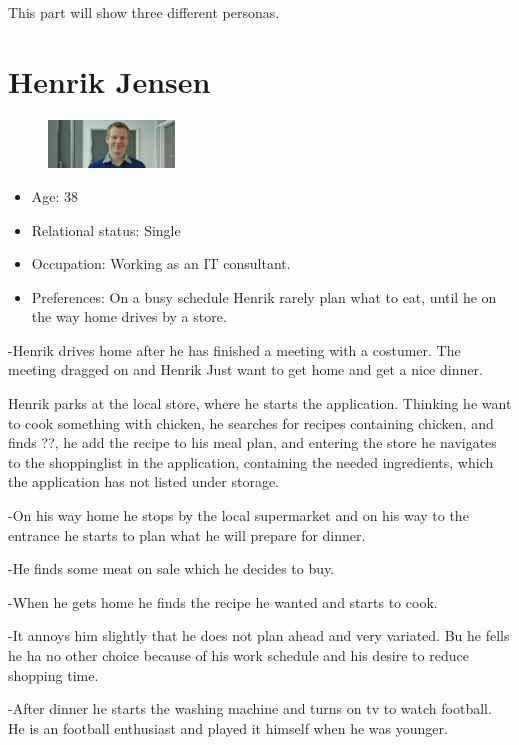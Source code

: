 This part will show three different personas.

\section{Henrik Jensen}
\begin{figure}[H]
	\includegraphics[width=0.30\textwidth]{Grafik/FoodPlanner/PersonaHenrikJensen}
	\label{PersonaHenrikJensen}
\end{figure}
\begin{itemize}
	\item Age: 38
	\item Relational status: Single
	\item Occupation: Working as an IT consultant.
	\item Preferences: On a busy schedule Henrik rarely plan what to eat, until he on the way home drives by a store.
\end{itemize}
-Henrik drives home after he has finished a meeting with a costumer. The meeting dragged on and Henrik Just want to get home and get a nice dinner.

Henrik parks at the local store, where he starts the application. Thinking he want to cook something with chicken, he searches for recipes containing chicken, and finds ??, he add the recipe to his meal plan, and entering the store he navigates to the shoppinglist in the application, containing the needed ingredients, which the application has not listed under storage.

-On his way home he stops by the local supermarket and on his way to the entrance he starts to plan what he will prepare for dinner.

-He finds some meat on sale which he decides to buy.

-When he gets home he finds the recipe he wanted and starts to cook.

-It annoys him slightly that he does not plan ahead and very variated. Bu he fells he ha no other choice because of his work schedule and his desire to reduce shopping time.

-After dinner he starts the washing machine and turns on tv to watch football. He is an football enthusiast and played it himself when he was younger. 

